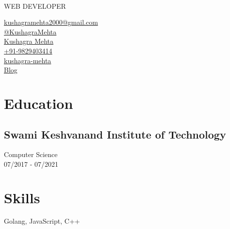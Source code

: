 \documentclass[]{Kushagra-build}
\begin{document}
%
%
\\
\selectfont WEB DEVELOPER \normalfont

\vspace{2em}
    
%
%
\begin{minipage}[t]{0.29\textwidth} 



\faEnvelope \href{mailto:kushagramehta2000@gmail.com}{   kushagramehta2000@gmail.com}\\
\faGithub \href{https://github.com/KushagraMehta}{  @KushagraMehta}\\
\faLinkedinSquare \href{https://www.linkedin.com/in/kushagra-mehta-/}{  Kushagra Mehta} \\
\faPhone \href{tel:+91-9829403414}{ +91-9829403414}\\
\faTwitter \href{https://twitter.com/kushagra_mehta}{   kushagra-mehta} \\
\faPencil \href{https://dev.to/kushagra_mehta}{ Blog}


\section{Education} 

\subsection{Swami Keshvanand Institute of Technology}
Computer Science \\
07/2017 - 07/2021 \\
\sectionsep

\section{Skills}
Golang, JavaScript, C++\\ 


\end{minipage}
\end{document}
